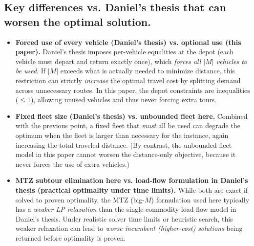 \documentclass[a4paper,twoside]{article}
\begin{document}
\subsection{Key differences vs. Daniel's thesis that can worsen the optimal solution.}
\begin{itemize}
    \item \textbf{Forced use of every vehicle (Daniel's thesis) vs. optional use (this paper).}
    Daniel's thesis imposes per-vehicle equalities at the depot (each vehicle must depart and return exactly once), which \emph{forces all $|M|$ vehicles to be used}. If $|M|$ exceeds what is actually needed to minimize distance, this restriction can strictly \emph{increase} the optimal travel cost by splitting demand across unnecessary routes. In this paper, the depot constraints are inequalities ($\leq 1$), allowing unused vehicles and thus never forcing extra tours.
    
    \item \textbf{Fixed fleet size (Daniel's thesis) vs. unbounded fleet here.}
    Combined with the previous point, a fixed fleet that \emph{must} all be used can degrade the optimum when the fleet is larger than necessary for the instance, again increasing the total traveled distance. (By contrast, the unbounded-fleet model in this paper cannot worsen the distance-only objective, because it never forces the use of extra vehicles.)
    
    \item \textbf{MTZ subtour elimination here vs. load-flow formulation in Daniel's thesis (practical optimality under time limits).}
    While both are exact if solved to proven optimality, the MTZ (big-$M$) formulation used here typically has a \emph{weaker LP relaxation} than the single-commodity load-flow model in Daniel's thesis. Under realistic solver time limits or heuristic search, this weaker relaxation can lead to \emph{worse incumbent (higher-cost) solutions} being returned before optimality is proven.
\end{itemize}
\end{document}
